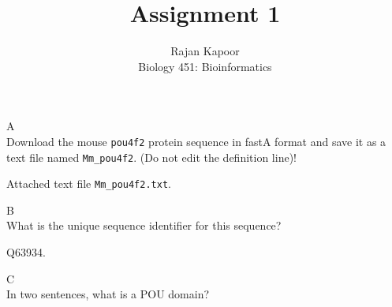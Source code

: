 \documentclass[12pt]{article}
\begin{document}
 
\title{Assignment 1}
\author{Rajan Kapoor\\ 
Biology 451: Bioinformatics}
 
\maketitle
 
\begin{problem}{A}
\text{ }\\
Download the mouse \texttt{pou4f2} protein sequence in fastA format and save it as a text file named \texttt{Mm\_pou4f2}. (Do not edit the definition line)! 
\end{problem}
 
\begin{solution}
Attached text file \texttt{Mm\_pou4f2.txt}.
\end{solution}

\begin{problem}{B}
\text{ }\\
What is the unique sequence identifier for this sequence?
\end{problem}
 
\begin{solution}
Q63934.
\end{solution}

\begin{problem}{C}
\text{ }\\
In two sentences, what is a POU domain? 
\end{problem}
 
\end{document}
